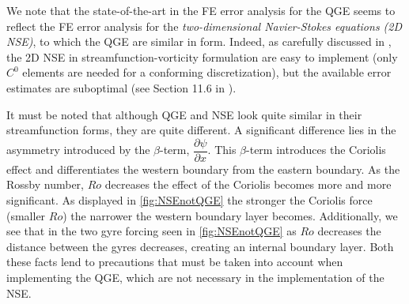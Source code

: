 We note that the state-of-the-art in the FE error analysis for the QGE seems to
reflect the FE error analysis for the \emph{two-dimensional Navier-Stokes
equations (2D NSE)}, to which the QGE are similar in form.  Indeed, as carefully
discussed in \cite{Gunzburger89}, the 2D NSE in streamfunction-vorticity
formulation are easy to implement (only $C^0$ elements are needed for a
conforming discretization), but the available error estimates are suboptimal
(see Section 11.6 in \cite{Gunzburger89}).
\begin{remark}
  It must be noted that although QGE and NSE look quite similar in their
  streamfunction forms, they are quite different. A significant difference lies
  in the asymmetry introduced by the $\beta$-term, $\dfrac{\partial
  \psi}{\partial x}$. This $\beta$-term introduces the Coriolis effect and
  differentiates the western boundary from the eastern boundary.  As the Rossby
  number, $Ro$ decreases the effect of the Coriolis becomes more and more
  significant. As displayed in \autoref{fig:NSEnotQGE} the stronger the
  Coriolis force (smaller $Ro$) the narrower the western boundary layer becomes.
  Additionally, we see that in the two gyre forcing seen in
  \autoref{fig:NSEnotQGE} as $Ro$ decreases the distance between the gyres
  decreases, creating an internal boundary layer. Both these facts lend to
  precautions that must be taken into account when implementing the QGE, which
  are not necessary in the implementation of the NSE.
\end{remark}

